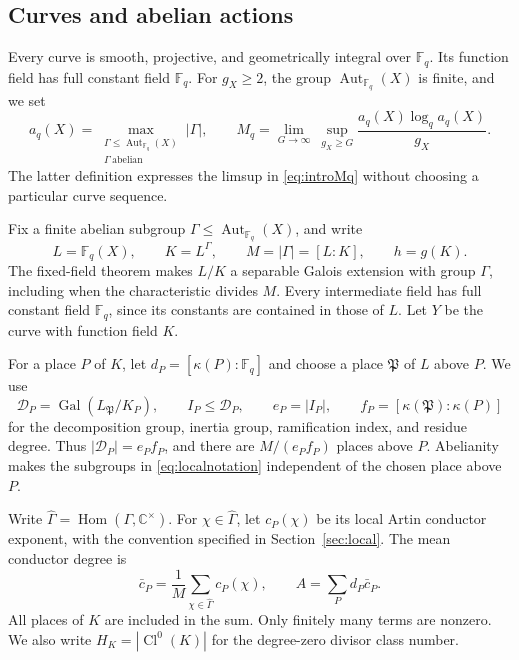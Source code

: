 \documentclass[12pt,onecolumn,draftclsnofoot,letterpaper]{IEEEtran}
\theoremstyle{remark}
\newcommand{\F}{\mathbb F}
\newcommand{\C}{\mathbb C}
\newcommand{\Aut}{\operatorname{Aut}}
\newcommand{\Gal}{\operatorname{Gal}}
\newcommand{\Cl}{\operatorname{Cl}}
\begin{document}
\subsection{Curves and abelian actions}
Every curve is smooth, projective, and geometrically integral over $\F_q$. Its function field has full constant field $\F_q$. For $g_X\ge2$, the group $\Aut_{\F_q}(X)$ is finite, and we set
\begin{equation}
 a_q(X)=\max_{\substack{\Gamma\le\Aut_{\F_q}(X)\\\Gamma\ \mathrm{abelian}}}|\Gamma|,
 \qquad
 M_q=\lim_{G\to\infty}\ \sup_{g_X\ge G}
 \frac{a_q(X)\log_q a_q(X)}{g_X}.
 \label{eq:defMq}
\end{equation}
The latter definition expresses the limsup in \eqref{eq:introMq} without choosing a particular curve sequence.

Fix a finite abelian subgroup $\Gamma\le\Aut_{\F_q}(X)$, and write
\begin{equation}
 L=\F_q(X),\qquad K=L^\Gamma,\qquad
 M=|\Gamma|=[L:K],\qquad h=g(K).
 \label{eq:LK}
\end{equation}
The fixed-field theorem makes $L/K$ a separable Galois extension with group $\Gamma$, including when the characteristic divides $M$. Every intermediate field has full constant field $\F_q$, since its constants are contained in those of $L$. Let $Y$ be the curve with function field $K$.

For a place $P$ of $K$, let $d_P=[\kappa(P):\F_q]$ and choose a place $\mathfrak P$ of $L$ above $P$. We use
\begin{equation}
 \mathcal D_P=\Gal(L_{\mathfrak P}/K_P),\qquad
 I_P\le\mathcal D_P,\qquad e_P=|I_P|,\qquad
 f_P=[\kappa(\mathfrak P):\kappa(P)]
 \label{eq:localnotation}
\end{equation}
for the decomposition group, inertia group, ramification index, and residue degree. Thus $|\mathcal D_P|=e_Pf_P$, and there are $M/(e_Pf_P)$ places above $P$. Abelianity makes the subgroups in \eqref{eq:localnotation} independent of the chosen place above $P$.

Write $\widehat\Gamma=\operatorname{Hom}(\Gamma,\C^\times)$. For $\chi\in\widehat\Gamma$, let $c_P(\chi)$ be its local Artin conductor exponent, with the convention specified in Section~\ref{sec:local}. The mean conductor degree is
\begin{equation}
 \bar c_P=\frac1M\sum_{\chi\in\widehat\Gamma}c_P(\chi),
 \qquad A=\sum_Pd_P\bar c_P.
 \label{eq:mean}
\end{equation}
All places of $K$ are included in the sum. Only finitely many terms are nonzero. We also write $H_K=|\Cl^0(K)|$ for the degree-zero divisor class number.
\end{document}
